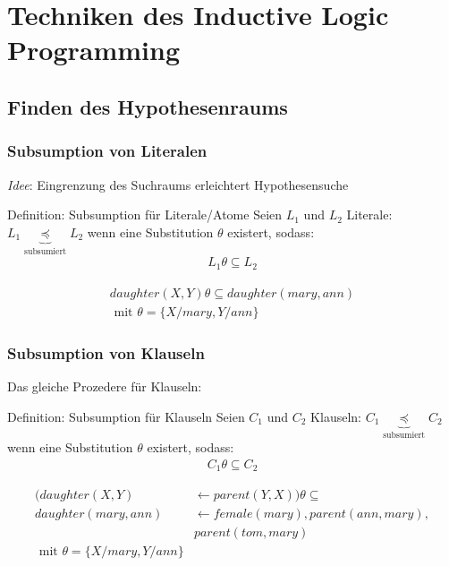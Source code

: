 \section{Techniken des Inductive Logic Programming}
\subsection{Finden des Hypothesenraums}
\begin{frame}
	\frametitle{Subsumption von Literalen}
	\emph{Idee}: Eingrenzung des Suchraums erleichtert Hypothesensuche

	\begin{block}{Definition: Subsumption für Literale/Atome}
		Seien $L_1$ und $L_2$ Literale: $L_1 \underbrace{\preceq}_{\text{subsumiert}} L_2$
		wenn eine Substitution $\theta$ existert, sodass:
		\begin{align*}
			 L_1 \theta \subseteq L_2
		\end{align*}
	\end{block}
	\begin{bsp}
		\begin{align*}
			 daughter(X, Y)\theta\subseteq daughter(mary, ann)\\\text{  mit  } \theta = \{X/mary, Y/ann\}
		\end{align*}
	\end{bsp}
\end{frame}
\begin{frame}
	\frametitle{Subsumption von Klauseln}
	Das gleiche Prozedere für Klauseln:
	\begin{block}{Definition: Subsumption für Klauseln}
		Seien $C_1$ und $C_2$ Klauseln: $C_1 \underbrace{\preceq}_{\text{subsumiert}} C_2$
		wenn eine Substitution $\theta$ existert, sodass:
		\begin{align*}
			 C_1 \theta \subseteq C_2
		\end{align*}
	\end{block}
	\begin{bsp}
		\begin{align*}
			(daughter(X, Y)      &\leftarrow parent(Y,X))\theta \subseteq\\
			 daughter(mary, ann) &\leftarrow female(mary), parent(ann, mary),\\
			                     & parent(tom, mary)\\
			 \text{  mit  } \theta = \{X/mary, Y/ann\}
		\end{align*}
	\end{bsp}
\end{frame}

